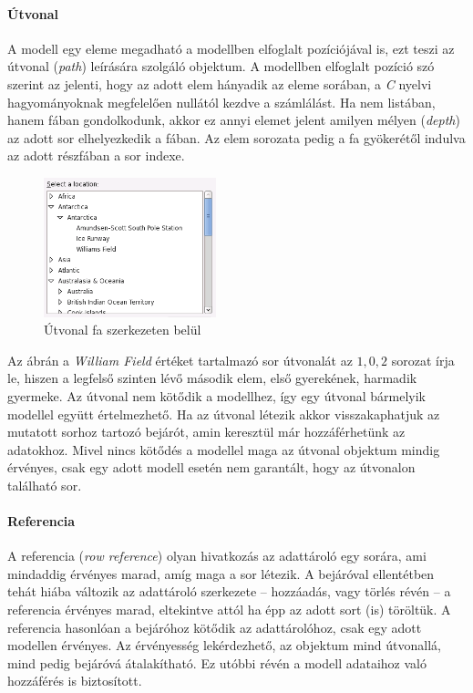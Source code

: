\paragraph{Útvonal}

A modell egy eleme megadható a modellben elfoglalt pozíciójával is, ezt teszi az útvonal (\textit{path}) leírására szolgáló objektum. A modellben elfoglalt pozíció szó szerint az jelenti, hogy az adott elem hányadik az eleme sorában, a \textit{C} nyelvi hagyományoknak megfelelően nullától kezdve a számlálást. Ha nem listában, hanem fában gondolkodunk, akkor ez annyi elemet jelent amilyen mélyen (\textit{depth}) az adott sor elhelyezkedik a fában. Az elem sorozata pedig a fa gyökerétől indulva az adott részfában a sor indexe.

\begin{figure}[h]
\begin{center}
\includegraphics[width=50mm]{images/tree.png}
\caption{Útvonal fa szerkezeten belül}
\end{center}
\end{figure}

Az ábrán a \textit{William Field} értéket tartalmazó sor útvonalát az $1, 0, 2$ sorozat írja le, hiszen a legfelső szinten lévő második elem, első gyerekének, harmadik gyermeke. Az útvonal nem kötődik a modellhez, így egy útvonal bármelyik modellel együtt értelmezhető. Ha az útvonal létezik akkor visszakaphatjuk az mutatott sorhoz tartozó bejárót, amin keresztül már hozzáférhetünk az adatokhoz. Mivel nincs kötődés a modellel maga az útvonal objektum mindig érvényes, csak egy adott modell esetén nem garantált, hogy az útvonalon található sor.

\paragraph{Referencia}

A referencia (\textit{row reference}) olyan hivatkozás az adattároló egy sorára, ami mindaddig érvényes marad, amíg maga a sor létezik. A bejáróval ellentétben tehát hiába változik az adattároló szerkezete -- hozzáadás, vagy törlés révén -- a referencia érvényes marad, eltekintve attól ha épp az adott sort (is) töröltük. A referencia hasonlóan a bejáróhoz kötődik az adattárolóhoz, csak egy adott modellen érvényes. Az érvényesség lekérdezhető, az objektum mind útvonallá, mind pedig bejáróvá átalakítható. Ez utóbbi révén a modell adataihoz való hozzáférés is biztosított.

